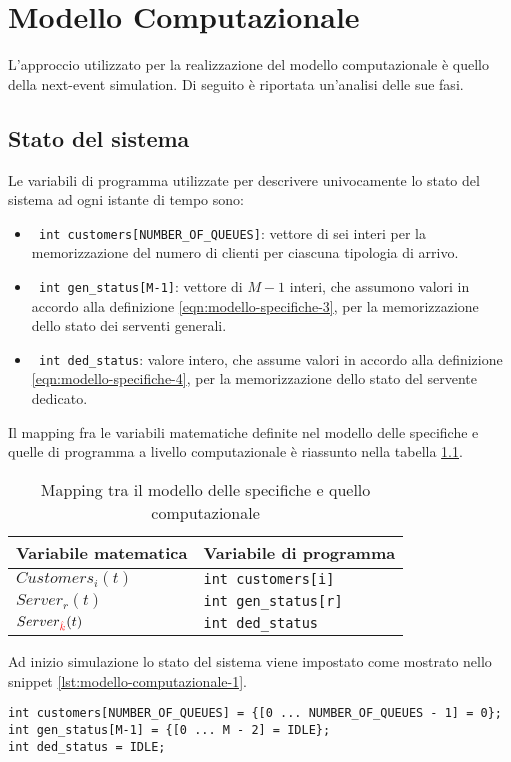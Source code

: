 \chapter{Modello Computazionale}\label{chp:modello-computazionale}
L'approccio utilizzato per la realizzazione del modello computazionale è quello della next-event simulation. Di seguito è riportata un'analisi delle sue fasi.
\section{Stato del sistema}\label{sec:modello-computazionale-stato}
Le variabili di programma utilizzate per descrivere univocamente lo stato del sistema ad ogni istante di tempo sono:
\begin{itemize}
\item \texttt{{\color{code_purple} int} customers[NUMBER\_OF\_QUEUES]}: vettore di sei interi per la memorizzazione del numero di clienti per ciascuna tipologia di arrivo.
\item \texttt{{\color{code_purple} int} gen\_status[M-1]}: vettore di $M-1$ interi, che assumono valori in accordo alla definizione \ref{eqn:modello-specifiche-3}, per la memorizzazione dello stato dei serventi generali.
\item \texttt{{\color{code_purple} int} ded\_status}: valore intero, che assume valori in accordo alla definizione \ref{eqn:modello-specifiche-4}, per la memorizzazione dello stato del servente dedicato.
\end{itemize}

Il mapping fra le variabili matematiche definite nel modello delle specifiche e quelle di programma a livello computazionale è riassunto nella tabella \ref{table:modello-computazionale-1}. 

\begin{table}[ht]
\centering
{\tablecolors
\begin{tabular}{| l | l |}
\hline
Variabile matematica & Variabile di programma \\
\hline
$Customers_i(t)$ & \texttt{{\color{code_purple}int} customers[i]} \\
\hline
$Server_r(t)$ & \texttt{{\color{code_purple}int} gen\_status[r]} \\
\hline
$Server_{\color{red}\hat{k}}(t)$ & \texttt{{\color{code_purple}int} ded\_status} \\
\hline
\end{tabular}}
\caption{Mapping tra il modello delle specifiche e quello computazionale}
\label{table:modello-computazionale-1}
\end{table}
\newpage
Ad inizio simulazione lo stato del sistema viene impostato come mostrato nello snippet \ref{lst:modello-computazionale-1}.
\begin{lstlisting}[label={lst:modello-computazionale-1}, caption={Inizializzazione dello stato del sistema}]
int customers[NUMBER_OF_QUEUES] = {[0 ... NUMBER_OF_QUEUES - 1] = 0};
int gen_status[M-1] = {[0 ... M - 2] = IDLE};
int ded_status = IDLE;
\end{lstlisting}

